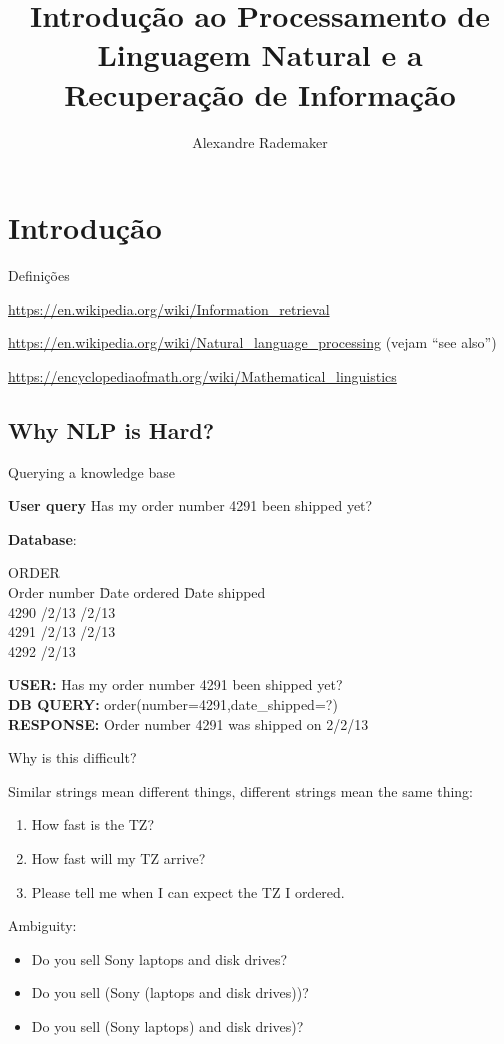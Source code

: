 \documentclass[compress]{beamer}
\title{Introdução ao Processamento de Linguagem Natural e a Recuperação de Informação}
\author{Alexandre Rademaker}
\institute[EMAp, FGV]{Escola de Matemática Aplicada, Fundação Getúlio Vargas}
\date
\begin{document}
\begin{frame}
\titlepage
\end{frame}

\section{Introdução}

\begin{frame}{Definições}
  
  \url{https://en.wikipedia.org/wiki/Information_retrieval}

  \url{https://en.wikipedia.org/wiki/Natural_language_processing}
  (vejam ``see also'')

  \url{https://encyclopediaofmath.org/wiki/Mathematical_linguistics}
  
\end{frame}

\subsection{Why NLP is Hard?}

\begin{frame}{Querying a knowledge base}

{\bf User query} Has my order number 4291 been shipped yet?

{\bf Database}:
\begin{tabbing}
ORDER\\ 
Order number \hspace{0.5in} \=Date ordered \hspace{0.5in} \=Date shipped\\[0.05in]
4290              /2/13           /2/13\\
4291              /2/13           /2/13\\
4292              /2/13             
\end{tabbing}
{\bf USER:} Has my order number 4291 been shipped yet?\\
{\bf DB QUERY:} order(number=4291,date\_shipped=?)\\
{\bf RESPONSE:} Order number 4291 was shipped on 2/2/13
\end{frame} 

\begin{frame}{Why is this difficult?}

Similar strings mean different things, different strings mean the same
thing:
\begin{enumerate}[<+->]
\item How fast is the TZ?
\item How fast will my TZ arrive?
\item Please tell me when I can expect the TZ I ordered.
\end{enumerate}
Ambiguity:
\begin{itemize}[<+->]
\item Do you sell Sony laptops and disk drives?
\item Do you sell (Sony (laptops and disk drives))?
\item Do you sell (Sony laptops) and disk drives)?
\end{itemize}
\end{frame} 
\end{document}
